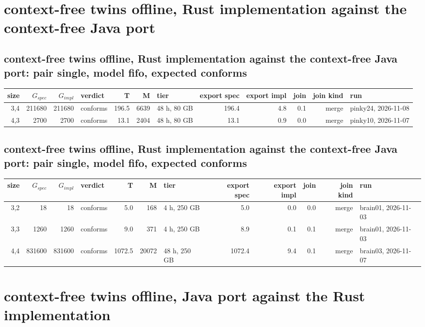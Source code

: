 \documentclass[10pt]{article}
\begin{document}
\section*{context-free twins offline, Rust implementation against the context-free Java port}
\subsection*{context-free twins offline, Rust implementation against the context-free Java port: pair \textsf{single}, model fifo, expected conforms}
\begin{longtable}{@{}rrrlrrlrrrrl@{}}
\toprule
size & $G_{\mathit{spec}}$ & $G_{\mathit{impl}}$ & verdict & T & M & tier & export spec & export impl & join & join kind & run \\
\midrule
\endhead
\color{red} 3,4 & 211680 & 211680 & conforms & 196.5 & 6639 & 48 h, 80 GB & 196.4 & 4.8 & 0.1 & merge & pinky24, 2026-11-08 \\
\color{red} 4,3 & 2700 & 2700 & conforms & 13.1 & 2404 & 48 h, 80 GB & 13.1 & 0.9 & 0.0 & merge & pinky10, 2026-11-07 \\
\bottomrule
\end{longtable}
\subsection*{context-free twins offline, Rust implementation against the context-free Java port: pair \textsf{single}, model fifo, expected conforms}
\begin{longtable}{@{}rrrlrrlrrrrl@{}}
\toprule
size & $G_{\mathit{spec}}$ & $G_{\mathit{impl}}$ & verdict & T & M & tier & export spec & export impl & join & join kind & run \\
\midrule
\endhead
\color{blue} 3,2 & 18 & 18 & conforms & 5.0 & 168 & 4 h, 250 GB & 5.0 & 0.0 & 0.0 & merge & brain01, 2026-11-03 \\
\color{blue} 3,3 & 1260 & 1260 & conforms & 9.0 & 371 & 4 h, 250 GB & 8.9 & 0.1 & 0.1 & merge & brain01, 2026-11-03 \\
\color{blue} 4,4 & 831600 & 831600 & conforms & 1072.5 & 20072 & 48 h, 250 GB & 1072.4 & 9.4 & 0.1 & merge & brain03, 2026-11-07 \\
\bottomrule
\end{longtable}
\section*{context-free twins offline, Java port against the Rust implementation}
\end{document}
